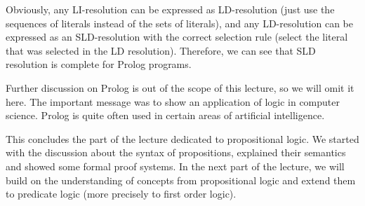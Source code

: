 Obviously, any LI-resolution can be expressed as LD-resolution (just use the sequences of literals instead of the sets of literals), and any LD-resolution can be expressed as an SLD-resolution with the correct selection rule
 (select the literal that was selected in the LD resolution). Therefore, we can see that SLD resolution is complete for Prolog programs.

Further discussion on Prolog is out of the scope of this lecture, so we will omit it here. The important message was to show an application of logic in computer science. Prolog is quite often used in certain areas of artificial intelligence.

\bigskip

This concludes the part of the lecture dedicated to propositional logic. We started with the discussion about the syntax of propositions, explained their semantics and showed some formal proof systems. In the next part of the lecture, we will build on the understanding of concepts from  propositional logic and extend them to predicate logic (more precisely to first order logic).

